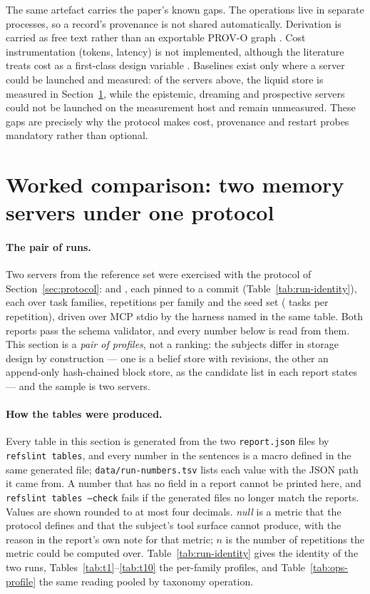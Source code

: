 \documentclass[11pt,a4paper]{article}
\begin{document}
The same artefact carries the paper's known gaps. The operations live in separate processes, so
a record's provenance is not shared automatically. Derivation is carried as free text rather
than an exportable PROV-O graph \cite{prov_o}. Cost instrumentation (tokens, latency) is not
implemented, although the literature treats cost as a first-class design variable
\cite{song2026dmem,xu2026linkedin}. Baselines exist only where a server could be launched and
measured: of the servers above, the liquid store is measured in Section~\ref{sec:compare}, while
the epistemic, dreaming and prospective servers could not be launched on the measurement host
and remain unmeasured. These gaps are precisely why the protocol makes cost, provenance and
restart probes mandatory rather than optional.

\section{Worked comparison: two memory servers under one protocol}
\label{sec:compare}

\paragraph{The pair of runs.} Two servers from the reference set were exercised with the
protocol of Section~\ref{sec:protocol}:  and
, each pinned to a commit (Table~\ref{tab:run-identity}), each over
 task families,  repetitions per family and the seed set
 ( tasks per repetition), driven over MCP stdio by the
harness named in the same table. Both reports pass the schema validator, and every number below
is read from them. This section is a \emph{pair of profiles}, not a ranking: the subjects differ
in storage design by construction --- one is a belief store with revisions, the other an
append-only hash-chained block store, as the candidate list in each report states --- and the
sample is two servers.

\paragraph{How the tables were produced.} Every table in this section is generated from the two
\texttt{report.json} files by \texttt{refslint tables}, and every number in the sentences is a
macro defined in the same generated file; \texttt{data/run-numbers.tsv} lists each value with the
JSON path it came from. A number that has no field in a report cannot be printed here, and
\texttt{refslint tables --check} fails if the generated files no longer match the reports.
Values are shown rounded to at most four decimals. \textit{null} is a metric that the protocol
defines and that the subject's tool surface cannot produce, with the reason in the report's own
note for that metric; $n$ is the number of repetitions the metric could be computed over.
Table~\ref{tab:run-identity} gives the identity of the two runs,
Tables~\ref{tab:t1}--\ref{tab:t10} the per-family profiles, and Table~\ref{tab:ops-profile} the
same reading pooled by taxonomy operation.
\end{document}
